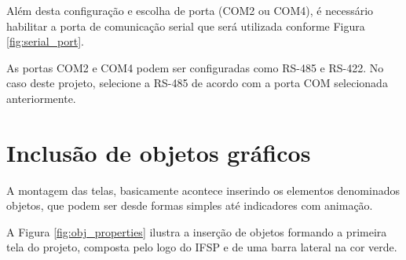 Além desta configuração e escolha de porta (COM2 ou COM4), 
é necessário habilitar a porta de comunicação serial que será utilizada conforme Figura \ref{fig:serial_port}. 


\begin{figure}[ht!]
	\centering
\end{figure}


As portas COM2 e COM4 podem ser configuradas como RS-485 e RS-422.
No caso deste projeto, selecione a RS-485 de acordo com a porta COM selecionada anteriormente. 





\section{Inclusão de objetos gráficos}


A montagem das telas, 
basicamente acontece inserindo os elementos denominados objetos, 
que podem ser desde formas simples até indicadores com animação. 


A Figura \ref{fig:obj_properties} 
ilustra a inserção de objetos formando a primeira tela do projeto,
composta pelo logo do IFSP e de uma barra lateral na cor verde.



\begin{figure}[ht!]
	\centering
\end{figure}


